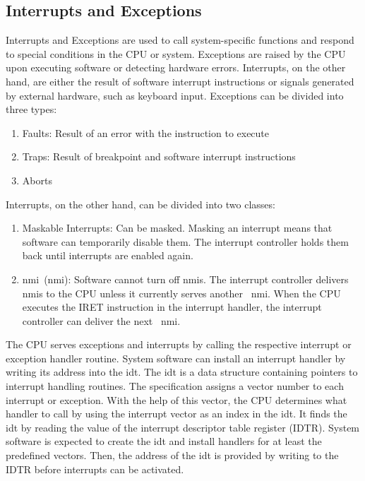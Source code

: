 \subsection{Interrupts and Exceptions}
\label{sec:state:technical:interrupts}
Interrupts and Exceptions are used to call system-specific functions and respond
to special conditions in the CPU or system. Exceptions are raised by the CPU
upon executing software or detecting hardware errors. Interrupts, on the other
hand, are either the result of software interrupt instructions or signals
generated by external hardware, such as keyboard input. Exceptions can be
divided into three types:
\begin{enumerate}
    \item Faults: Result of an error with the instruction to execute
    \item Traps: Result of breakpoint and software interrupt instructions
    \item Aborts
\end{enumerate}
Interrupts, on the other hand, can be divided into two classes:
\begin{enumerate}
    \item Maskable Interrupts: Can be masked. Masking an interrupt means that
          software can temporarily disable them. The interrupt controller holds
          them back until interrupts are enabled again.
    \item \Gls{nmi}~(\gls{nmi}): Software cannot turn off
          \gls{nmi}s. The interrupt controller delivers~
          \gls{nmi}s to the CPU unless it currently serves another~
          \gls{nmi}. When the CPU executes the IRET instruction in the
          interrupt handler, the interrupt controller can deliver the next~
          \gls{nmi}.
\end{enumerate}
The CPU serves exceptions and interrupts by calling the respective interrupt or
exception handler routine. System software can install an interrupt handler by
writing its address into the \gls{idt}. The
\gls{idt} is a data structure containing pointers to interrupt handling
routines. The specification assigns a vector number to each interrupt or
exception. With the help of this vector, the CPU determines what handler to call
by using the interrupt vector as an index in the \gls{idt}. It finds the
\gls{idt} by reading the value of the interrupt descriptor table register
(IDTR). System software is expected to create the \gls{idt} and install
handlers for at least the predefined vectors. Then, the address of the
\gls{idt} is provided by writing to the IDTR before interrupts can be
activated. \\

